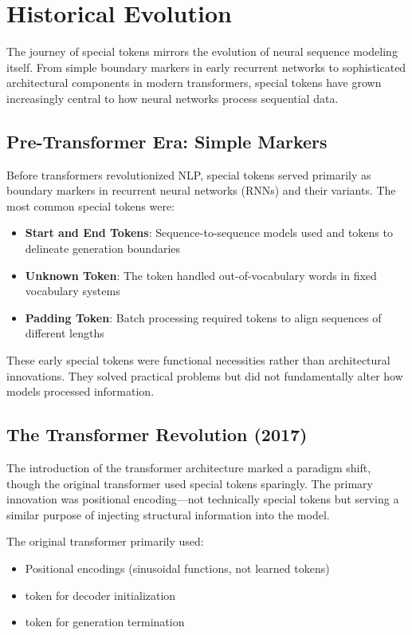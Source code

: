 \section{Historical Evolution}

The journey of special tokens mirrors the evolution of neural sequence modeling itself. From simple boundary markers in early recurrent networks to sophisticated architectural components in modern transformers, special tokens have grown increasingly central to how neural networks process sequential data.

\subsection{Pre-Transformer Era: Simple Markers}

Before transformers revolutionized NLP, special tokens served primarily as boundary markers in recurrent neural networks (RNNs) and their variants. The most common special tokens were:

\begin{itemize}
\item \textbf{Start and End Tokens}: Sequence-to-sequence models used  and  tokens to delineate generation boundaries
\item \textbf{Unknown Token}: The  token handled out-of-vocabulary words in fixed vocabulary systems
\item \textbf{Padding Token}: Batch processing required  tokens to align sequences of different lengths
\end{itemize}

These early special tokens were functional necessities rather than architectural innovations. They solved practical problems but did not fundamentally alter how models processed information.

\subsection{The Transformer Revolution (2017)}

The introduction of the transformer architecture \citep{vaswani2017attention} marked a paradigm shift, though the original transformer used special tokens sparingly. The primary innovation was positional encoding---not technically special tokens but serving a similar purpose of injecting structural information into the model.

\begin{example}
The original transformer primarily used:
\begin{itemize}
\item Positional encodings (sinusoidal functions, not learned tokens)
\item {} token for decoder initialization
\item {} token for generation termination
\end{itemize}
\end{example}

